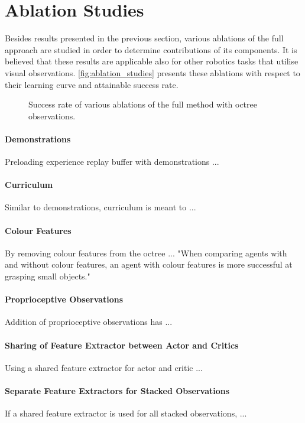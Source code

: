 \section{Ablation Studies}

Besides results presented in the previous section, various ablations of the full approach are studied in order to determine contributions of its components. It is believed that these results are applicable also for other robotics tasks that utilise visual observations. \autoref{fig:ablation_studies} presents these ablations with respect to their learning curve and attainable success rate.

\begin{figure}[ht]
    \centering
    \caption{Success rate of various ablations of the full method with octree observations.}
    \label{fig:ablation_studies}
\end{figure}

\paragraph{Demonstrations} Preloading experience replay buffer with demonstrations ...

\paragraph{Curriculum} Similar to demonstrations, curriculum is meant to ...

\paragraph{Colour Features} By removing colour features from the octree ...
"When comparing agents with and without colour features, an agent with colour features is more successful at grasping small objects."


\paragraph{Proprioceptive Observations} Addition of proprioceptive observations has ...

\paragraph{Sharing of Feature Extractor between Actor and Critics} Using a shared feature extractor for actor and critic ...

\paragraph{Separate Feature Extractors for Stacked Observations} If a shared feature extractor is used for all stacked observations, ...
